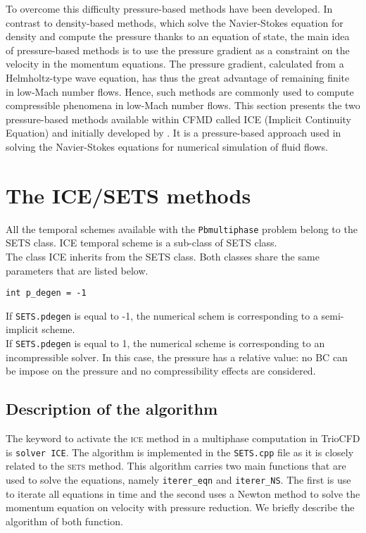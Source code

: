 To overcome this difficulty pressure-based methods have been developed. In contrast to density-based methods, which solve the Navier-Stokes equation for density and compute the pressure thanks to an equation of state, the main idea of pressure-based methods is to use the pressure gradient as a constraint on the velocity in the momentum equations. The pressure gradient, calculated from a Helmholtz-type wave equation, has thus the great advantage of remaining finite in low-Mach number flows. Hence, such methods are commonly used to compute compressible phenomena in low-Mach number flows. 
This section presents the two pressure-based methods available within CFMD called ICE (Implicit Continuity Equation) and initially developed by \textcite{harlow1968numerical,harlow1971numerical}. It is a pressure-based approach used in solving the Navier-Stokes equations for numerical simulation of fluid flows. 

\section{The ICE/SETS methods} \label{time:ice}
All the temporal schemes available with the \texttt{Pb\textunderscore multiphase} problem belong to the SETS class. ICE temporal scheme is a sub-class of SETS class.\\ The class ICE inherits from the SETS class. Both classes share the same parameters that are listed below.
\begin{lstlisting}
int p_degen = -1
\end{lstlisting}
If \texttt{SETS.p\textunderscore degen} is equal to -1, the numerical schem is corresponding to a semi-implicit scheme.\\ If \texttt{SETS.p\textunderscore degen} is equal to 1, the numerical scheme is corresponding to an incompressible solver. In this case, the pressure has a relative value: no BC can be impose on the pressure and no compressibility effects are considered.

\subsection{Description of the algorithm}
The keyword to activate the \textsc{ice} method in a multiphase computation in TrioCFD is \lstinline{solver ICE}. The algorithm is implemented in the \texttt{SETS.cpp} file as it is closely related to the \textsc{sets} method. This algorithm carries two main functions that are used to solve the equations, namely \texttt{iterer_eqn} and \texttt{iterer_NS}. The first is use to iterate all equations in time and the second uses a Newton method to solve the momentum equation on velocity with pressure reduction. We briefly describe the algorithm of both function.
